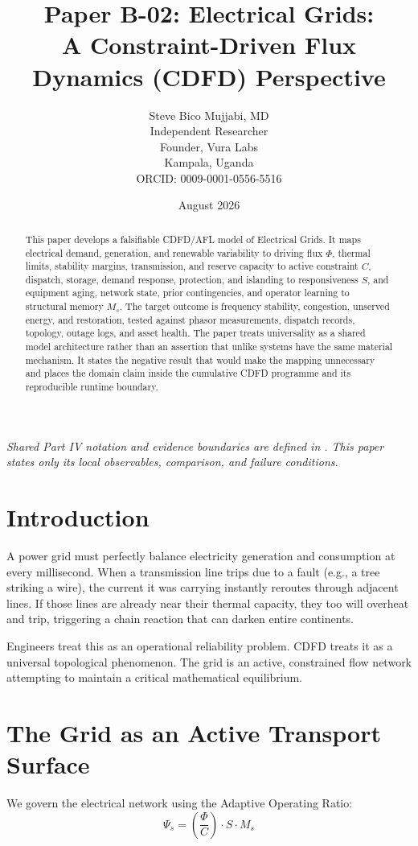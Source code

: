 \documentclass[11pt,a4paper]{article}
\title{\textbf{Paper B-02: Electrical Grids:\\ A Constraint-Driven Flux Dynamics (CDFD) Perspective}}
\author{Steve Bico Mujjabi, MD\\
\small Independent Researcher\\
\small Founder, Vura Labs\\
\small Kampala, Uganda\\
\small ORCID: 0009-0001-0556-5516}
\date{August 2026}
\begin{document}
\maketitle

\noindent\textit{Shared Part IV notation and evidence boundaries are defined in . This paper states only its local observables, comparison, and failure conditions.}


\begin{abstract}
This paper develops a falsifiable CDFD/AFL model of Electrical Grids. It maps electrical demand, generation, and renewable variability to driving flux $\Phi$, thermal limits, stability margins, transmission, and reserve capacity to active constraint $C$, dispatch, storage, demand response, protection, and islanding to responsiveness $S$, and equipment aging, network state, prior contingencies, and operator learning to structural memory $M_s$. The target outcome is frequency stability, congestion, unserved energy, and restoration, tested against phasor measurements, dispatch records, topology, outage logs, and asset health. The paper treats universality as a shared model architecture rather than an assertion that unlike systems have the same material mechanism. It states the negative result that would make the mapping unnecessary and places the domain claim inside the cumulative CDFD programme and its reproducible runtime boundary.
\end{abstract}

\section{Introduction}

A power grid must perfectly balance electricity generation and consumption at every millisecond. When a transmission line trips due to a fault (e.g., a tree striking a wire), the current it was carrying instantly reroutes through adjacent lines. If those lines are already near their thermal capacity, they too will overheat and trip, triggering a chain reaction that can darken entire continents.

Engineers treat this as an operational reliability problem. CDFD treats it as a universal topological phenomenon. The grid is an active, constrained flow network attempting to maintain a critical mathematical equilibrium.

\section{The Grid as an Active Transport Surface}
We govern the electrical network using the Adaptive Operating Ratio:
\begin{equation}
    \Psi_s = \left( \frac{\Phi}{C} \right) \cdot S \cdot M_s
\end{equation}
\end{document}
